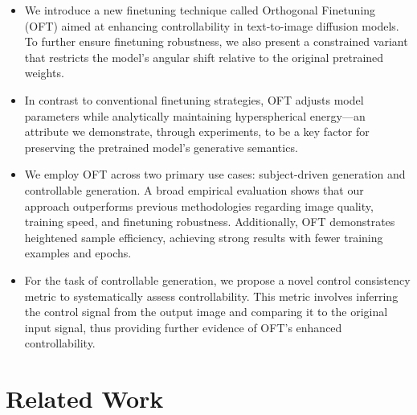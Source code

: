 \begin{itemize}[leftmargin=*,nosep]

    \item We introduce a new finetuning technique called Orthogonal Finetuning (OFT) aimed at enhancing controllability in text-to-image diffusion models. To further ensure finetuning robustness, we also present a constrained variant that restricts the model’s angular shift relative to the original pretrained weights.
    \item In contrast to conventional finetuning strategies, OFT adjusts model parameters while analytically maintaining hyperspherical energy—an attribute we demonstrate, through experiments, to be a key factor for preserving the pretrained model’s generative semantics.
    \item We employ OFT across two primary use cases: subject-driven generation and controllable generation. A broad empirical evaluation shows that our approach outperforms previous methodologies regarding image quality, training speed, and finetuning robustness. Additionally, OFT demonstrates heightened sample efficiency, achieving strong results with fewer training examples and epochs.
    \item For the task of controllable generation, we propose a novel control consistency metric to systematically assess controllability. This metric involves inferring the control signal from the output image and comparing it to the original input signal, thus providing further evidence of OFT’s enhanced controllability.
\end{itemize}

\section{Related Work}

